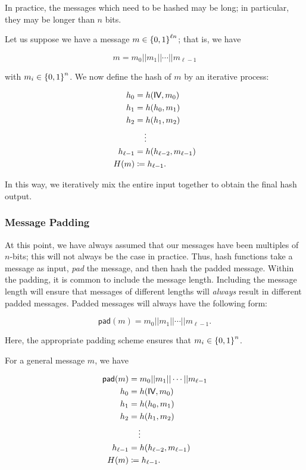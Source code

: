 In practice, the messages which need to be hashed may be long;
in particular, they may be longer than $n$ bits.

Let us suppose we have a message $m\in\left\{ 0,1 \right\}^{\ell n}$;
that is, we have

\begin{equation}
    m = m_{0}||m_{1}||\cdots||m_{\ell-1}
\end{equation}

\noindent
with $m_{i}\in\left\{ 0,1 \right\}^{n}$.
We now define the hash of $m$ by an iterative process:

\begin{align}
    h_{0} &= h(\textsf{IV}, m_{0}) \nonumber\\
    h_{1} &= h(h_{0}, m_{1}) \nonumber\\
    h_{2} &= h(h_{1}, m_{2}) \nonumber\\
        &\quad \vdots \nonumber\\
    h_{\ell-1} &= h(h_{\ell-2}, m_{\ell-1}) \nonumber\\
    H(m) &\coloneqq{} h_{\ell-1}.
\end{align}

\noindent
In this way, we iteratively mix the entire input together
to obtain the final hash output.

\subsubsection{Message Padding}

At this point, we have always assumed that our messages
have been multiples of $n$-bits;
this will not always be the case in practice.
Thus, \glspl{hash function} take a message as input,
\emph{pad} the message,
and then hash the padded message.
Within the padding, it is common to include the message length.
Including the message length will ensure that messages
of different lengths will \emph{always} result in different padded messages.
Padded messages will always have the following form:

\begin{equation}
    \textsf{pad}(m) = m_{0}||m_{1}||\cdots||m_{\ell-1}.
\end{equation}

\noindent
Here, the appropriate padding scheme ensures that
$m_{i}\in\left\{ 0,1 \right\}^{n}$.

For a general message $m$, we have

\begin{align}
    \textsf{pad}(m) &= m_{0}||m_{1}||\cdots||m_{\ell-1} \nonumber\\
    h_{0} &= h(\textsf{IV}, m_{0}) \nonumber\\
    h_{1} &= h(h_{0}, m_{1}) \nonumber\\
    h_{2} &= h(h_{1}, m_{2}) \nonumber\\
        &\quad \vdots \nonumber\\
    h_{\ell-1} &= h(h_{\ell-2}, m_{\ell-1}) \nonumber\\
    H(m) &\coloneqq{} h_{\ell-1}.
\end{align}

